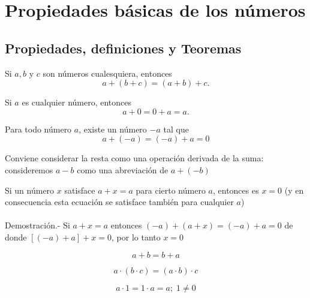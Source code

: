 \chapter{Propiedades básicas de los números}
\section{Propiedades, definiciones y Teoremas}
\begin{prop} Si $a,b$ y $c$ son números cualesquiera, entonces
$$a+(b+c) = (a+b)+c.$$
\end{prop}

\begin{prop} Si $a$ es cualquier número, entonces
$$a+0 = 0+a = a.$$
\end{prop}

\begin{prop} Para todo número $a$, existe un número $-a$ tal que
$$a+(-a) = (-a) + a = 0$$
\end{prop}

\begin{def.}
Conviene considerar la resta como una operación derivada de la suma: consideremos $a-b$ como una abreviación de $a+(-b)$\\
\end{def.}

\begin{lema}
Si un número $x$ satisface $a+x=a$ para cierto número $a$, entonces es $x=0$ (y en consecuencia esta ecuación se satisface también para cualquier $a$)\\\\
Demostración.- \; Si $a+x=a$ entonces $(-a)+(a+x)=(-a)+a=0$ de donde $\left[ (-a) + a \right] + x = 0$, por lo tanto $x=0$
\end{lema}


\begin{prop}
$$a+b = b+a$$
\end{prop}

\begin{prop}
$$a\cdot (b \cdot c) = (a \cdot b) \cdot c$$
\end{prop}

\begin{prop}
$$a \cdot 1 = 1 \cdot a = a; \; 1 \neq 0$$
\end{prop}

